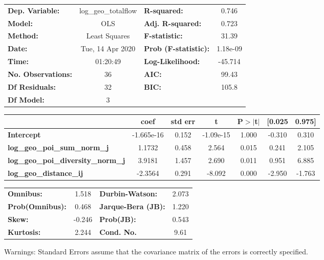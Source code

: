 \begin{center}
\begin{tabular}{lclc}
\toprule
\textbf{Dep. Variable:}                    & log\_geo\_totalflow & \textbf{  R-squared:         } &     0.746   \\
\textbf{Model:}                            &         OLS         & \textbf{  Adj. R-squared:    } &     0.723   \\
\textbf{Method:}                           &    Least Squares    & \textbf{  F-statistic:       } &     31.39   \\
\textbf{Date:}                             &   Tue, 14 Apr 2020  & \textbf{  Prob (F-statistic):} &  1.18e-09   \\
\textbf{Time:}                             &       01:20:49      & \textbf{  Log-Likelihood:    } &   -45.714   \\
\textbf{No. Observations:}                 &            36       & \textbf{  AIC:               } &     99.43   \\
\textbf{Df Residuals:}                     &            32       & \textbf{  BIC:               } &     105.8   \\
\textbf{Df Model:}                         &             3       & \textbf{                     } &             \\
\bottomrule
\end{tabular}
\begin{tabular}{lcccccc}
                                           & \textbf{coef} & \textbf{std err} & \textbf{t} & \textbf{P$> |$t$|$} & \textbf{[0.025} & \textbf{0.975]}  \\
\midrule
\textbf{Intercept}                         &   -1.665e-16  &        0.152     & -1.09e-15  &         1.000        &       -0.310    &        0.310     \\
\textbf{log\_geo\_poi\_sum\_norm\_j}       &       1.1732  &        0.458     &     2.564  &         0.015        &        0.241    &        2.105     \\
\textbf{log\_geo\_poi\_diversity\_norm\_j} &       3.9181  &        1.457     &     2.690  &         0.011        &        0.951    &        6.885     \\
\textbf{log\_geo\_distance\_ij}            &      -2.3564  &        0.291     &    -8.092  &         0.000        &       -2.950    &       -1.763     \\
\bottomrule
\end{tabular}
\begin{tabular}{lclc}
\textbf{Omnibus:}       &  1.518 & \textbf{  Durbin-Watson:     } &    2.073  \\
\textbf{Prob(Omnibus):} &  0.468 & \textbf{  Jarque-Bera (JB):  } &    1.220  \\
\textbf{Skew:}          & -0.246 & \textbf{  Prob(JB):          } &    0.543  \\
\textbf{Kurtosis:}      &  2.244 & \textbf{  Cond. No.          } &     9.61  \\
\bottomrule
\end{tabular}
\end{center}

Warnings: \newline
 [1] Standard Errors assume that the covariance matrix of the errors is correctly specified.